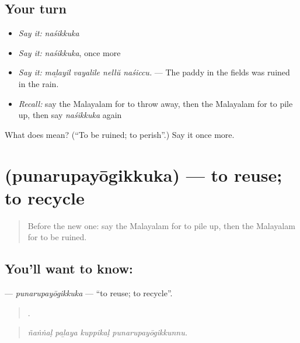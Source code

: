 \subsection*{Your turn}
\begin{itemize}
\raggedright
  \item \emph{Say it:} \emph{naśikkuka}
  \item \emph{Say it:} \emph{naśikkuka}, once more
  \item \emph{Say it:} \emph{maḻayil vayalile nellŭ naśiccu.} — The paddy in the fields was ruined in the rain.
  \item \emph{Recall:} say the Malayalam for to throw away, then the Malayalam for to pile up, then say \emph{naśikkuka} again
\end{itemize}

\begin{tcolorbox}[breakable,colback=teal!4,colframe=teal!35!black,title={Before you move on}]
What does  mean? (\textquotedblleft{}To be ruined; to perish\textquotedblright{}.) Say it once more.
\end{tcolorbox}
\section[\texorpdfstring{\ml{പുനരുപയോഗിക്കുക} (punarupayōgikkuka)}{പുനരുപയോഗിക്കുക (punarupayōgikkuka)}]{ (punarupayōgikkuka) — to reuse; to recycle}

\label{lesson:ML-C504-punarupayogikkuka}



\begin{quote}
Before the new one: say the Malayalam for to pile up, then the Malayalam for to be ruined.
\end{quote}

\subsection*{You'll want to know: }
\textbf{} — \emph{punarupayōgikkuka} — \textquotedblleft{}to reuse; to recycle\textquotedblright{}.

\begin{quote}
   .
\end{quote}

\begin{quote}
\emph{ñaṅṅaḷ paḻaya kuppikaḷ punarupayōgikkunnu.}
\end{quote}

